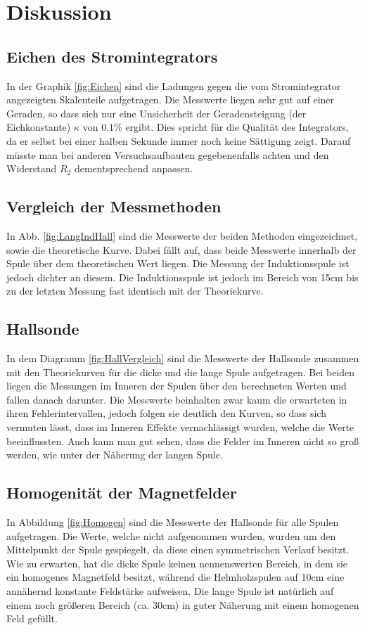\documentclass[12pt,a4paper,titlepage,headinclude,bibtotoc]{scrartcl}
\begin{document}
\section{Diskussion}
\label{sec:diskussion}
\subsection{Eichen des Stromintegrators}
In der Graphik \ref{fig:Eichen} sind die Ladungen gegen die vom Stromintegrator angezeigten Skalenteile aufgetragen.
Die Messwerte liegen sehr gut auf einer Geraden, so dass sich nur eine Unsicherheit der Geradensteigung (der Eichkonstante) $\kappa$ von $0.1\%$ ergibt.
Dies spricht für die Qualität des  Integrators, da er selbst bei einer halben Sekunde immer noch keine Sättigung zeigt.
Darauf müsste man bei anderen Versuchsaufbauten gegebenenfalls achten und den Widerstand $R_2$ dementsprechend anpassen.

\subsection{Vergleich der Messmethoden}
In Abb. \ref{fig:LangIndHall} sind die Messwerte der beiden Methoden eingezeichnet, sowie die theoretische Kurve.
Dabei fällt auf, dass beide Messwerte innerhalb der Spule über dem theoretischen Wert liegen.
Die Messung der Induktionsspule ist jedoch dichter an diesem.
Die Induktionsspule ist jedoch im Bereich von 15cm bis zu der letzten Messung fast identisch mit der Theoriekurve.

\subsection{Hallsonde}
In dem Diagramm \ref{fig:HallVergleich} sind die Messwerte der Hallsonde zusammen mit den Theoriekurven für die dicke und die lange Spule aufgetragen.
Bei beiden liegen die Messungen im Inneren der Spulen über den berechneten Werten und fallen danach darunter.
Die Messwerte beinhalten zwar kaum die erwarteten in ihren Fehlerintervallen, jedoch folgen sie deutlich den Kurven, so dass sich vermuten lässt, dass im Inneren Effekte vernachlässigt wurden, welche die Werte beeinflussten.
Auch kann man gut sehen, dass die Felder im Inneren nicht so groß werden, wie unter der Näherung der langen Spule.


\subsection{Homogenität der Magnetfelder}
In Abbildung \ref{fig:Homogen} sind die Messwerte der Hallsonde für alle Spulen aufgetragen.
Die Werte, welche nicht aufgenommen wurden, wurden um den Mittelpunkt der Spule gespiegelt, da diese einen symmetrischen Verlauf besitzt.
Wie zu erwarten, hat die dicke Spule keinen nennenswerten Bereich, in dem sie ein homogenes Magnetfeld besitzt, während die Helmholzspulen auf 10cm eine annähernd konstante Feldstärke aufweisen.
Die lange Spule ist natürlich auf einem noch größeren Bereich (ca. 30cm) in guter Näherung mit einem homogenen Feld gefüllt.
\end{document}
